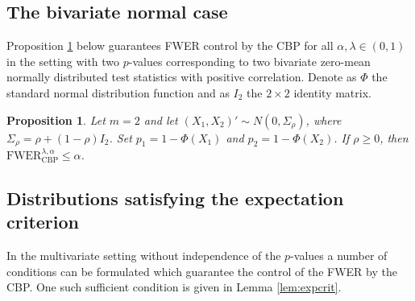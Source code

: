 \documentclass {imsart}
\newtheorem{Proposition}{Proposition}
\newcommand{\FWERcb}{\mathrm{FWER}_{\mathrm{CBP}}^{\lambda,\alpha}}
\begin{document}
\subsection{The bivariate normal case}

Proposition \ref{thm:bivnorm} below guarantees FWER control by the CBP for all $\alpha,\lambda\in(0,1)$ in the setting with two $p$-values corresponding to two bivariate zero-mean normally distributed test statistics with positive correlation. Denote as $\Phi$ the standard normal distribution function and as $I_2$ the $2\times 2$ identity matrix.




\begin{Proposition}
\label{thm:bivnorm}
Let $m=2$ and let $(X_1,X_2)'\sim{}N(0,\Sigma_\rho)$, where $\Sigma_\rho=\rho+(1-\rho)I_2$. Set $p_1=1-\Phi(X_1)$ and $p_2=1-\Phi(X_2)$. If $\rho\geq0$, then $\FWERcb\leq\alpha$.
\end{Proposition}

\subsection{Distributions satisfying the expectation criterion}

In the multivariate setting without independence of the $p$-values a number of conditions can be formulated which guarantee the control of the FWER by the CBP. One such sufficient condition is given in Lemma \ref{lem:expcrit}.
\end{document}
